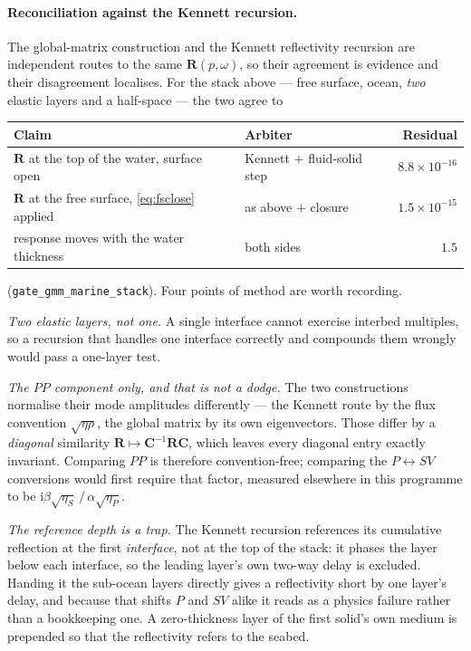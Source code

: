 \documentclass[11pt,a4paper]{article}
\newcommand{\ii}{\mathrm{i}}
\newcommand{\bR}{\mathbf{R}}
\newcommand{\bC}{\mathbf{C}}
\begin{document}
\paragraph{Reconciliation against the Kennett recursion.} The global-matrix
construction and the Kennett reflectivity recursion are independent routes to
the same $\bR(p,\omega)$, so their agreement is evidence and their disagreement
localises. For the stack above --- free surface, ocean, \emph{two} elastic
layers and a half-space --- the two agree to
\begin{center}
\begin{tabular}{llr}
\toprule
Claim & Arbiter & Residual \\
\midrule
$\bR$ at the top of the water, surface open & Kennett $+$ fluid-solid step & $8.8\times10^{-16}$ \\
$\bR$ at the free surface, \eqref{eq:fsclose} applied & as above $+$ closure & $1.5\times10^{-15}$ \\
response moves with the water thickness & both sides & $1.5$ \\
\bottomrule
\end{tabular}
\end{center}
(\texttt{gate\_gmm\_marine\_stack}). Four points of method are worth recording.

\emph{Two elastic layers, not one.} A single interface cannot exercise interbed
multiples, so a recursion that handles one interface correctly and compounds
them wrongly would pass a one-layer test.

\emph{The $PP$ component only, and that is not a dodge.} The two constructions
normalise their mode amplitudes differently --- the Kennett route by the flux
convention $\sqrt{\eta\rho}$, the global matrix by its own eigenvectors. Those
differ by a \emph{diagonal} similarity $\bR\mapsto\bC^{-1}\bR\bC$, which leaves
every diagonal entry exactly invariant. Comparing $PP$ is therefore
convention-free; comparing the $P\!\leftrightarrow\!SV$ conversions would first
require that factor, measured elsewhere in this programme to be
$\ii\beta\sqrt{\eta_S}\,/\,\alpha\sqrt{\eta_P}$.

\emph{The reference depth is a trap.} The Kennett recursion references its
cumulative reflection at the first \emph{interface}, not at the top of the
stack: it phases the layer below each interface, so the leading layer's own
two-way delay is excluded. Handing it the sub-ocean layers directly gives a
reflectivity short by one layer's delay, and because that shifts $P$ and $SV$
alike it reads as a physics failure rather than a bookkeeping one. A
zero-thickness layer of the first solid's own medium is prepended so that the
reflectivity refers to the seabed.
\end{document}
